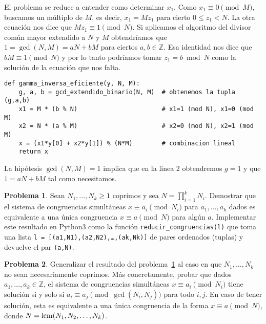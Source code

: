 \documentclass[a4paper, 11pt]{article}
\newcommand{\ZZ}{\mathbb{Z}}
\newcounter{numerodetema}
\theoremstyle{plain}
\theoremstyle{definition}
\newtheorem{prob}{Problema}[numerodetema]
\begin{document}
\bigskip

El problema se reduce a entender como determinar $x_1$. Como $x_1\equiv0\pmod{M}$,
buscamos un múltiplo de $M$, es decir, $x_1=Mz_1$ para cierto $0\leq z_1<N$. La
otra ecuación nos dice que $Mz_1\equiv 1\pmod{N}$. Si aplicamos el algoritmo
del divisor común mayor extendido a $N$ y $M$ obtendríamos que $1=\gcd(N,M)=aN+bM$
para ciertos $a,b\in\ZZ$. Esa identidad nos dice que $bM\equiv1\pmod{N}$ y por
lo tanto podríamos tomar $z_1=b\bmod{N}$ como la solución de la ecuación que
nos falta.

\bigskip

\begin{lstlisting}
def gamma_inversa_eficiente(y, N, M):
    g, a, b = gcd_extendido_binario(N, M)  # obtenemos la tupla (g,a,b)
    x1 = M * (b % N)                       # x1=1 (mod N), x1=0 (mod M)
    x2 = N * (a % M)                       # x2=0 (mod N), x2=1 (mod M)
    x = (x1*y[0] + x2*y[1]) % (N*M)        # combinacion lineal
    return x
\end{lstlisting}

\bigskip

La hipótesis $\gcd(N,M)=1$ implica que en la linea 2 obtendremos $g=1$ y
que $1=aN+bM$ tal como necesitamos.

\begin{prob}\label{prob:cong1}
Sean $N_1,\ldots,N_k\geq 1$ coprimos y sea $N=\prod_{i=1}^kN_i$. Demostrar que
el sistema de congruencias simultáneas $x\equiv a_i\pmod{N_i}$ para
$a_1,\ldots,a_k$ dados es equivalente a una única congruencia
$x\equiv a\pmod{N}$ para algún $a$. Implementar este resultado en Python3 como
la función \texttt{reducir\_congruencias(l)} que toma una lista
\texttt{l = [(a1,N1),(a2,N2),\ldots,(ak,Nk)]} de pares ordenados (tuplas)
y devuelve el par \texttt{(a,N)}.
\end{prob}

\begin{prob}
Generalizar el resultado del problema~\ref{prob:cong1} al caso en que
$N_1,\ldots,N_k$ no sean necesariamente coprimos. Más concretamente,
probar que dados $a_1,\ldots,a_k\in\ZZ$, el sistema de congruencias
simultáneas $x\equiv a_i\pmod{N_i}$ tiene solución si y solo si
$a_i\equiv a_j\pmod{\gcd(N_i,N_j)}$ para todo $i,j$. En caso de
tener solución, esta es equivalente a una única congruencia de la
forma $x\equiv a\pmod{N}$, donde $N={\rm lcm}(N_1,N_2,\ldots,N_k)$.
\end{prob}

\bigskip
\end{document}

